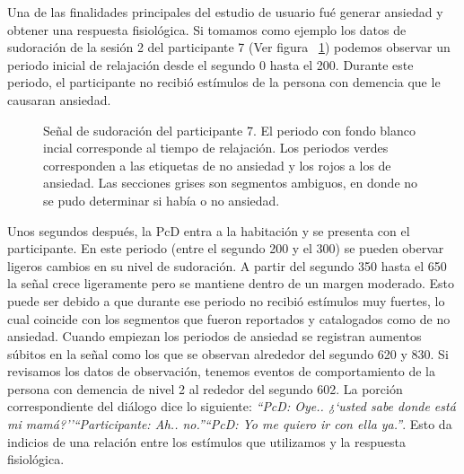 Una de las finalidades principales del estudio de usuario fu\'e generar ansiedad y obtener una respuesta fisiol\'ogica. Si tomamos como ejemplo los datos de sudoraci\'on de la sesi\'on 2 del participante 7 (Ver figura ~\ref{fig:anxietyinduction}) podemos observar un periodo inicial de relajaci\'on desde el segundo 0 hasta el 200. Durante este periodo, el participante no recibi\'o est\'imulos de la persona con demencia que le causaran ansiedad.
\begin{figure}[h!]
        \centering
        \caption{Se\~nal de sudoraci\'on del participante 7. El periodo con fondo blanco incial corresponde al tiempo de relajaci\'on. Los periodos verdes corresponden a las etiquetas de no ansiedad y los rojos a los de ansiedad. Las secciones grises son segmentos ambiguos, en donde no se pudo determinar si hab\'ia o no ansiedad.}\label{fig:anxietyinduction}

\end{figure}

Unos segundos despu\'es, la PcD entra a la habitaci\'on y se presenta con el participante. En este periodo (entre el segundo 200 y el 300) se pueden obervar ligeros cambios en su nivel de sudoraci\'on. A partir del segundo 350 hasta el 650 la se\~nal crece ligeramente pero se mantiene dentro de un margen moderado. Esto puede ser debido a que durante ese periodo no recibi\'o est\'imulos muy fuertes, lo cual coincide con los segmentos que fueron reportados y catalogados como de no ansiedad. Cuando empiezan los periodos de ansiedad se registran aumentos s\'ubitos en la se\~nal como los que se observan alrededor del segundo 620 y 830. Si revisamos los datos de observaci\'on, tenemos eventos de comportamiento de la persona con demencia de nivel 2 al rededor del segundo 602. La porci\'on correspondiente del di\'alogo dice lo siguiente: \textit{``PcD: Oye.. ¿`usted sabe donde está mi mamá?''}\textit{``Participante: Ah.. no.''}\textit{``PcD: Yo me quiero ir con ella ya.''}. Esto da indicios de una relaci\'on entre los est\'imulos que utilizamos y la respuesta fisiol\'ogica.

